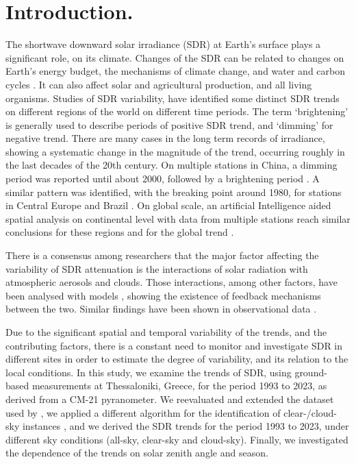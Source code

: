 \documentclass[applsci,article,submit,moreauthors,pdftex]{Definitions/mdpi}
\begin{document}

\hypertarget{introduction.}{%
\section{Introduction.}\label{introduction.}}

The shortwave downward solar irradiance (SDR) at Earth's surface plays a
significant role, on its climate. Changes of the SDR can be related to
changes on Earth's energy budget, the mechanisms of climate change, and
water and carbon cycles \citep{Wild2009}. It can also affect solar and
agricultural production, and all living organisms. Studies of SDR
variability, have identified some distinct SDR trends on different
regions of the world on different time periods. The term `brightening'
is generally used to describe periods of positive SDR trend, and
`dimming' for negative trend. There are many cases in the long term
records of irradiance, showing a systematic change in the magnitude of
the trend, occurring roughly in the last decades of the 20th century. On
multiple stations in China, a dimming period was reported until about
2000, followed by a brightening period \citep{Yang2021}. A similar
pattern was identified, with the breaking point around 1980, for
stations in Central Europe \citep{Wild2021} and Brazil
\citep{Yamasoe2021}. On global scale, an artificial Intelligence aided
spatial analysis on continental level with data from multiple stations
reach similar conclusions for these regions and for the global trend
\citep{Yuan2021}.

There is a consensus among researchers that the major factor affecting
the variability of SDR attenuation is the interactions of solar
radiation with atmospheric aerosols and clouds. Those interactions,
among other factors, have been analysed with models
\citep{Li2016, Samset2018}, showing the existence of feedback mechanisms
between the two. Similar findings have been shown in observational data
\citep[ and references
therein]{Schwarz2020, Ohvril2009, Zerefos2009, Xia2007}.

Due to the significant spatial and temporal variability of the trends,
and the contributing factors, there is a constant need to monitor and
investigate SDR in different sites in order to estimate the degree of
variability, and its relation to the local conditions. In this study, we
examine the trends of SDR, using ground-based measurements at
Thessaloniki, Greece, for the period 1993 to 2023, as derived from a
CM-21 pyranometer. We reevaluated and extended the dataset used by
\citet{Bais2013}, we applied a different algorithm for the
identification of clear-/cloud-sky instances
\citep{Reno2016, Reno2012a}, and we derived the SDR trends for the
period 1993 to 2023, under different sky conditions (all-sky, clear-sky
and cloud-sky). Finally, we investigated the dependence of the trends on
solar zenith angle and season.
\end{document}
